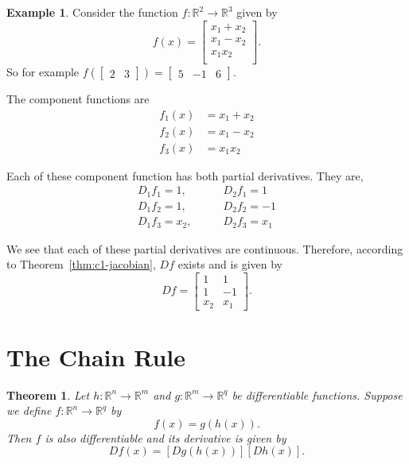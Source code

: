 \documentclass[11pt,reqno,openany]{amsbook}
\numberwithin{figure}{chapter}
\numberwithin{equation}{chapter}
\theoremstyle{plain}
\newtheorem{thm}{Theorem}[chapter]
\theoremstyle{definition}
\newtheorem{xmpl}{Example}[chapter]
\renewcommand{\Re}{\mathbb{R}}
\begin{document}
\begin{xmpl}
  Consider the function $f\colon \Re^2 \to \Re^3$ given by
  \[f(x) = \begin{bmatrix}
    x_1+x_2\\
    x_1 - x_2\\
    x_1 x_2\\
   \end{bmatrix}.\]
   So for example $f(\begin{bmatrix} 2 & 3 \end{bmatrix})
   = \begin{bmatrix} 5 & -1 & 6 \end{bmatrix}$.

   The component functions are
   \begin{align*}
     f_1(x) &= x_1+x_2\\
     f_2(x) &= x_1-x_2\\
     f_3(x) &= x_1 x_2
   \end{align*}

   Each of these component function has both partial
   derivatives. They are,
   \begin{align*}
     D_1f_1 = 1,\qquad & D_2 f_1 = 1\\
     D_1f_2 = 1,\qquad & D_2 f_2 = -1\\
     D_1f_3 = x_2,\qquad & D_2 f_3 = x_1
   \end{align*}
   
   We see that each of these partial derivatives are
   continuous. Therefore, according to
   Theorem~\ref{thm:c1-jacobian}, $Df$ exists and is given by
   \[Df=
   \begin{bmatrix}
     1 & 1\\
     1 & -1\\
     x_2 &  x_1
   \end{bmatrix}
   .\]
\end{xmpl}

\section{The Chain Rule}
\begin{thm}\label{thm:chainrule-n}
  Let $h\colon \Re^n \to \Re^m$ and $g\colon \Re^m \to
  \Re^q$ be differentiable functions. Suppose we define
  $f\colon \Re^n \to \Re^q$ by
  \[f(x)=g(h(x)).\]
  Then $f$ is also differentiable and its derivative is
  given by
  \begin{equation}
    \label{eq:chainrule-n}
    Df(x) = [Dg(h(x))][Dh(x)].
  \end{equation}
\end{thm}
\end{document}
